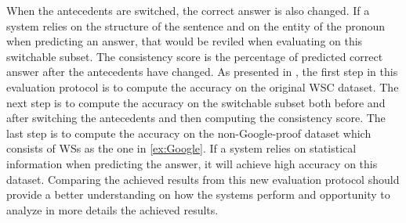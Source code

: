 When the antecedents are switched, the correct answer is also changed. If a system relies on the structure of the sentence and on the entity of the pronoun when predicting an answer, that would be reviled when evaluating on this switchable subset.
The consistency score is the percentage of predicted correct answer after the antecedents have changed.
As presented in \cite{DBLP:journals/corr/abs-1811-01778}, the first step in this evaluation protocol is to compute the accuracy on the original WSC dataset. The next step is to compute the accuracy on the switchable subset both before and after switching the antecedents and then computing the consistency score. The last step is to compute the accuracy on the non-Google-proof dataset which consists of WSs as the one in \ref{ex:Google}. If a system relies on statistical information when predicting the answer, it will achieve high accuracy on this dataset.
Comparing the achieved results from this new evaluation protocol should provide a better understanding on how the systems perform and opportunity to analyze in more details the achieved results.
